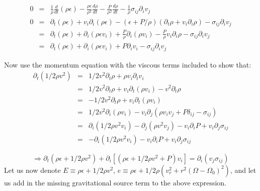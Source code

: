 \documentclass{article}
\begin{document}
\begin{eqnarray*}
  0 &=& \frac{1}{\rho} \frac{d}{dt}(\rho \epsilon) - \frac{\rho \epsilon}{\rho^2} \frac{d \rho}{dt} - \frac{P}{\rho^2}\frac{d\rho}{dt}-\frac{1}{\rho} \sigma_{ij} \partial_i v_j\\
  0 &=& \partial_t (\rho \epsilon) + v_i \partial_i (\rho \epsilon) - (\epsilon + P/\rho)(\partial_t \rho + v_i \partial_i \rho)- \sigma_{ij} \partial_i v_j\\
    &=& \partial_t(\rho \epsilon) + \partial_i(\rho \epsilon v_i) + \frac{P}{\rho} \partial_i(\rho v_i)  -  \frac{P}{\rho} v_i \partial_i \rho- \sigma_{ij} \partial_i v_j\\
    &=&  \partial_t(\rho \epsilon) + \partial_i(\rho \epsilon v_i) + P\partial_i v_i- \sigma_{ij} \partial_i v_j
\end{eqnarray*}

Now use the momentum equation with the viscous terms included to show that:
\begin{eqnarray*}
  \partial_t  (1/2 \rho v^2) &=&1/2v^2 \partial_t \rho + \rho v_i \partial_t v_i\\
                             &=&1/2v^2 \partial_t \rho +  v_i \partial_t (\rho v_i) - v^2 \partial_t \rho\\
                             &=& -1/2 v^2 \partial_t \rho + v_i \partial_t (\rho v_i)\\
                             &=& 1/2 v^2 \partial_i(\rho v_i) - v_i \partial_j(\rho v_i v_j + P \delta_{ij} - \sigma_{ij})\\
                             &=& \partial_i(1/2 \rho v^2 v_i) - \partial_j(\rho v^2 v_j) - v_i \partial_i P + v_i \partial_j \sigma_{ij}\\
                             &=& - \partial_i(1/2 \rho v^2 v_i) - v_i \partial_i P + v_i \partial_j \sigma_{ij}
\end{eqnarray*}

\begin{equation*}
  \Rightarrow  \partial_t(\rho \epsilon + 1/2 \rho v^2) + \partial_i \left[(\rho \epsilon + 1/2 \rho v^2 + P)v_i\right] = \partial_i(v_j \sigma_{ij}) 
\end{equation*}
Let us now denote $E \equiv \rho \epsilon + 1/2 \rho v^2$, $e \equiv \rho \epsilon + 1/2 \rho (v_r^2 + r^2(\Omega-\Omega_0)^2)$, and let us add in the missing gravitational source term to the above expression.
\end{document}

